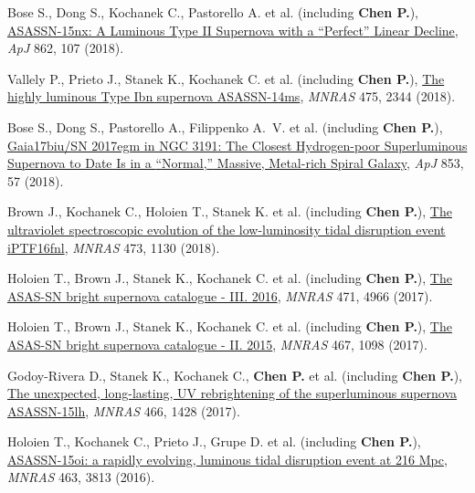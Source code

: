 \item Bose S., Dong S., Kochanek C., Pastorello A. et al. (including \textbf{Chen P.}), \href{https://ui.adsabs.harvard.edu/abs/2018ApJ...862..107B}{ASASSN-15nx: A Luminous Type II Supernova with a {\textquotedblleft}Perfect{\textquotedblright} Linear Decline}, \textit{ApJ} 862, 107 (2018).

\item Vallely P., Prieto J., Stanek K., Kochanek C. et al. (including \textbf{Chen P.}), \href{https://ui.adsabs.harvard.edu/abs/2018MNRAS.475.2344V}{The highly luminous Type Ibn supernova ASASSN-14ms}, \textit{MNRAS} 475, 2344 (2018).

\item Bose S., Dong S., Pastorello A., Filippenko A.~V. et al. (including \textbf{Chen P.}), \href{https://ui.adsabs.harvard.edu/abs/2018ApJ...853...57B}{Gaia17biu/SN 2017egm in NGC 3191: The Closest Hydrogen-poor Superluminous Supernova to Date Is in a {\textquotedblleft}Normal,{\textquotedblright} Massive, Metal-rich Spiral Galaxy}, \textit{ApJ} 853, 57 (2018).

\item Brown J., Kochanek C., Holoien T., Stanek K. et al. (including \textbf{Chen P.}), \href{https://ui.adsabs.harvard.edu/abs/2018MNRAS.473.1130B}{The ultraviolet spectroscopic evolution of the low-luminosity tidal disruption event iPTF16fnl}, \textit{MNRAS} 473, 1130 (2018).

\item Holoien T., Brown J., Stanek K., Kochanek C. et al. (including \textbf{Chen P.}), \href{https://ui.adsabs.harvard.edu/abs/2017MNRAS.471.4966H}{The ASAS-SN bright supernova catalogue - III. 2016}, \textit{MNRAS} 471, 4966 (2017).

\item Holoien T., Brown J., Stanek K., Kochanek C. et al. (including \textbf{Chen P.}), \href{https://ui.adsabs.harvard.edu/abs/2017MNRAS.467.1098H}{The ASAS-SN bright supernova catalogue - II. 2015}, \textit{MNRAS} 467, 1098 (2017).

\item Godoy-Rivera D., Stanek K., Kochanek C., \textbf{Chen P.} et al. (including \textbf{Chen P.}), \href{https://ui.adsabs.harvard.edu/abs/2017MNRAS.466.1428G}{The unexpected, long-lasting, UV rebrightening of the superluminous supernova ASASSN-15lh}, \textit{MNRAS} 466, 1428 (2017).

\item Holoien T., Kochanek C., Prieto J., Grupe D. et al. (including \textbf{Chen P.}), \href{https://ui.adsabs.harvard.edu/abs/2016MNRAS.463.3813H}{ASASSN-15oi: a rapidly evolving, luminous tidal disruption event at 216 Mpc}, \textit{MNRAS} 463, 3813 (2016).


